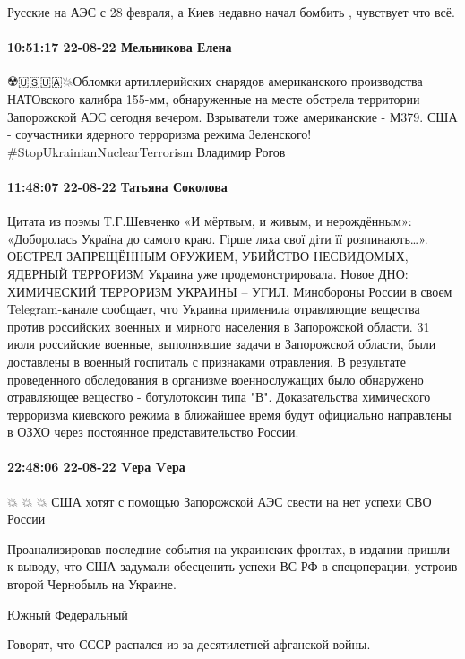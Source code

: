Русские на АЭС с 28 февраля, а Киев недавно начал бомбить , чувствует что всё.

\paragraph{10:51:17 22-08-22 Мельникова Елена}

☢️🇺🇸🇺🇦💥Обломки артиллерийских снарядов американского производства НАТОвского калибра 155-мм, обнаруженные на месте обстрела территории Запорожской АЭС сегодня вечером.
Взрыватели тоже американские - М379.
США - соучастники ядерного терроризма режима Зеленского!
#StopUkrainianNuclearTerrorism
Владимир Рогов

\paragraph{11:48:07 22-08-22 Татьяна Соколова}

Цитата из поэмы Т.Г.Шевченко «И мёртвым, и живым, и нерождённым»: «Доборолась Україна до самого краю. Гірше ляха свої діти її розпинають…».
ОБСТРЕЛ ЗАПРЕЩЁННЫМ ОРУЖИЕМ, УБИЙСТВО НЕСВИДОМЫХ, ЯДЕРНЫЙ ТЕРРОРИЗМ Украина уже продемонстрировала. Новое ДНО:
ХИМИЧЕСКИЙ ТЕРРОРИЗМ УКРАИНЫ – УГИЛ.
Минобороны России в своем Telegram-канале сообщает, что Украина применила отравляющие вещества против российских военных и мирного населения в Запорожской области. 31 июля российские военные, выполнявшие задачи в Запорожской области, были доставлены в военный госпиталь с признаками отравления. В результате проведенного обследования в организме военнослужащих было обнаружено отравляющее вещество - ботулотоксин типа "В". Доказательства химического терроризма киевского режима в ближайшее время будут официально направлены в ОЗХО через постоянное представительство России.

\paragraph{22:48:06 22-08-22 Vера Vера}

💥 💥 💥 США хотят с помощью Запорожской АЭС свести на нет успехи СВО России

Проанализировав последние события на украинских фронтах, в издании пришли к
выводу, что США задумали обесценить успехи ВС РФ в спецоперации, устроив второй
Чернобыль на Украине.

Южный Федеральный

Говорят, что СССР распался из-за десятилетней афганской войны.

